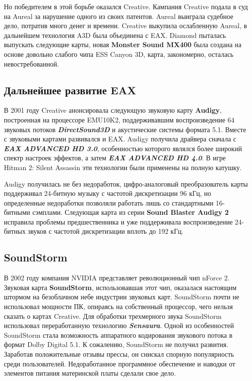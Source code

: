 \documentclass[a4paper,12pt]{extarticle}
\begin{document}
    Но победителем в этой борьбе оказался Creative. Кампания Creative подала в суд на Aureal за нарушение одного из своих патентов. Aureal выиграла судебное дело, потратив много денег и времени. Creative выкупила ослабленную Aureal, в дальнейшем технология A3D была объединена с EAX. Diamond пыталась выпускать следующие карты, новая \textbf{Monster Sound MX400} была создана на основе довольно слабого чипа ESS Canyon 3D, карта, закономерно, осталась невостребованной.

    \subsection{Дальнейшее развитие EAX}
    В 2001 году Creative анонсировала следующую звуковую карту \textbf{Audigy}, построенная на процессоре EMU10K2, поддерживавшим воспроизведение 64 звуковых потоков \textbf{\textit{DirectSound3D}} и акустические системы формата 5.1. Вместе с звуковыми картами развивался и EAX. Audigy получила драйвера сначала с \textbf{\textit{EAX ADVANCED HD 3.0}}, особенностью которого являлся более широкий спектр настроек эффектов, а затем \textbf{\textit{EAX ADVANCED HD 4.0}}. В игре Hitman 2: Silent Assassin эти технологии были применены на полную катушку.

    Audigy получилась не без недоработок, цифро-аналоговый преобразователь карты поддерживал 24-битную музыку с частотой дискретизации 96 кГц, но определенные недоработки позволяли работать лишь со стандартными 16-битными сэмплами. Следующая карта из серии \textbf{Sound Blaster Audigy 2} исправила проблемы предшественника и уже поддерживала воспроизведение 24-битных звуков с частотой дискретизации вплоть до 192 кГц.

    \subsection{SoundStorm}
    В 2002 году компания NVIDIA представляет революционный чип nForce 2. Звуковая карта \textbf{SoundStorm}, использовавшая этот чип, оказалася настоящим штормом на безоблачном небе индустрии звуковых карт. SoundStorm почти не использовал мощности ПК, опираясь на собственный процессор, чего нельзя сказать о картах Creative. Для обработки трехмерного звука SoundStorm использовал переработанную технологию  \textbf{\textit{Sensaura}}. Одной из особенностей SoundStorm стала возможность аппаратного кодирования звукового потока в формат Dolby Digital 5.1. К сожалению, SoundStorm не получил развития. Заработав положительные отзывы прессы, он снискал спорную популярность среди пользователей. Недоработанное программное обеспечение и наводки от элементов питания материнской платы сделали свое дело.
\end{document}
